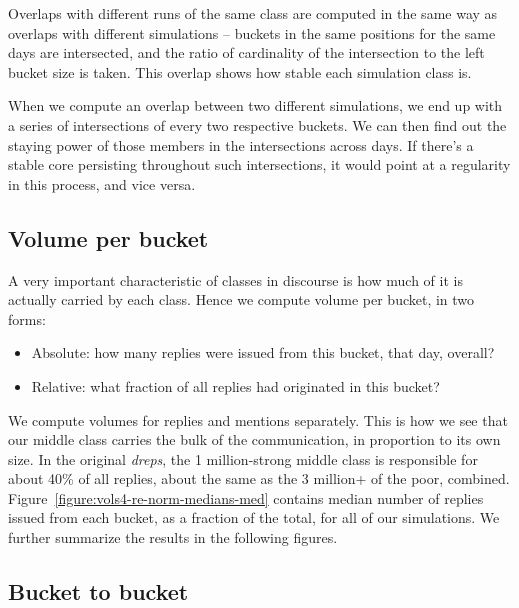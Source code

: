 \documentclass[10pt,oneside]{memoir}
\begin{document}
\begin{Spacing}{2}
\label{section:overx-xreps}
Overlaps with different runs of the same class are computed in the same way as overlaps with different simulations -- buckets in the same positions for the same days are intersected, and the ratio of cardinality of the intersection to the left bucket size is taken.  This overlap shows how stable each simulation class is.


When we compute an overlap between two different simulations, we end up with a series of intersections of every two respective buckets.  We can then find out the staying power of those members in the intersections across days.  If there's a stable core persisting throughout such intersections, it would point at a regularity in this process, and vice versa.


\pagebreak \subsection{Volume per bucket}
\label{volumeperbucket}

A very important characteristic of classes in discourse is how much of it is actually carried by each class.  Hence we compute volume per bucket, in two forms:


\begin{itemize}


\item Absolute: how many replies were issued from this bucket, that day, overall?

\item Relative: what fraction of all replies had originated in this bucket?
\end{itemize}

We compute volumes for replies and mentions separately.  This is how we see that our middle class carries the bulk of the communication, in proportion to its own size.  In the original {\itshape dreps}, the 1 million-strong middle class is responsible for about 40\% of all replies, about the same as the 3 million+ of the poor, combined.  Figure~\ref{figure:vols4-re-norm-medians-med} contains median number of replies issued from each bucket, as a fraction of the total, for all of our simulations.  We further summarize the results in the following figures.


\subsection{Bucket to bucket}
\label{buckettobucket}


\end{Spacing}
\end{document}
